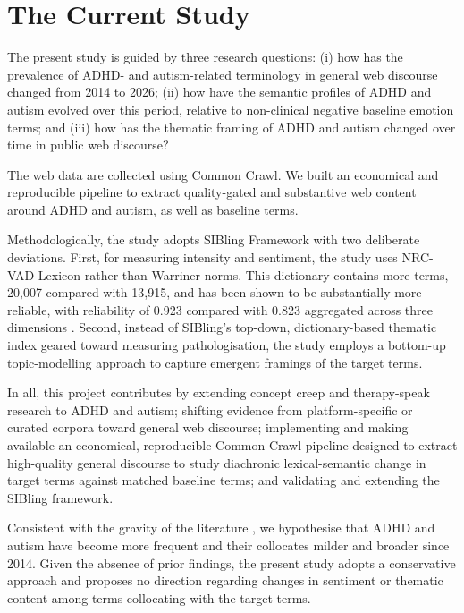 \section{The Current Study}

The present study is guided by three research questions: (i) how has the prevalence of ADHD- and autism-related terminology in general web discourse changed from 2014 to 2026; (ii) how have the semantic profiles of ADHD and autism evolved over this period, relative to non-clinical negative baseline emotion terms; and (iii) how has the thematic framing of ADHD and autism changed over time in public web discourse?

The web data are collected using Common Crawl. We built an economical and reproducible pipeline to extract quality-gated and substantive web content around ADHD and autism, as well as baseline terms.

Methodologically, the study adopts \citet{baesMultidimensionalFrameworkEvaluating2024} SIBling Framework with two deliberate deviations. First, for measuring intensity and sentiment, the study uses \citet{mohammadNRCVADLexicon2025} NRC-VAD Lexicon rather than Warriner norms. This dictionary contains more terms, 20,007 compared with 13,915, and has been shown to be substantially more reliable, with reliability of 0.923 compared with 0.823 aggregated across three dimensions \citep{mohammadNRCVADLexicon2025}. Second, instead of SIBling's top-down, dictionary-based thematic index geared toward measuring pathologisation, the study employs a bottom-up topic-modelling approach to capture emergent framings of the target terms.

In all, this project contributes by extending concept creep and therapy-speak research to ADHD and autism; shifting evidence from platform-specific \citep{iacobComputationalAnalysisEmergence2026,kangConvergingRepresentationsAttentionDeficit2025} or curated corpora \citep{baesMultidimensionalFrameworkEvaluating2024,baesSemanticInflationTrauma2023,baesSemanticShiftsMental2023,xiaoHaveConceptsAnxiety2023} toward general web discourse; implementing and making available an economical, reproducible Common Crawl pipeline designed to extract high-quality general discourse to study diachronic lexical-semantic change in target terms against matched baseline terms; and validating and extending the SIBling framework.

Consistent with the gravity of the literature \citep{baesSemanticInflationTrauma2023,baesSemanticShiftsMental2023,xiaoHaveConceptsAnxiety2023,iacobComputationalAnalysisEmergence2026,vylomovaSemanticChangesHarmrelated2021}, we hypothesise that ADHD and autism have become more frequent and their collocates milder and broader since 2014. Given the absence of prior findings, the present study adopts a conservative approach and proposes no direction regarding changes in sentiment or thematic content among terms collocating with the target terms.
